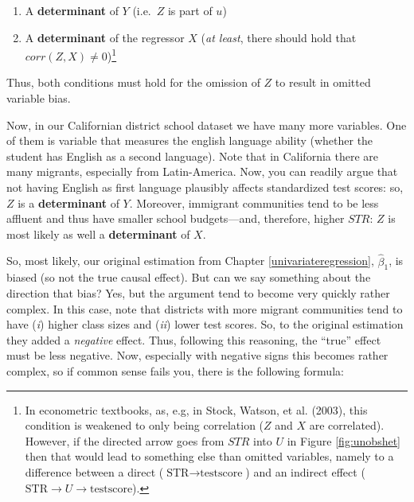 \documentclass[
]{book}
\providecommand{\tightlist}{%
  \setlength{\itemsep}{0pt}\setlength{\parskip}{0pt}}
\begin{document}
\begin{enumerate}
\def\labelenumi{\arabic{enumi}.}
\tightlist
\item
  A \textbf{determinant} of \(Y\) (i.e.~\(Z\) is part of \(u\))
\item
  A \textbf{determinant} of the regressor \(X\) (\emph{at least}, there should hold that \(corr(Z,X) \neq 0\))\footnote{In econometric textbooks, as, e.g, in Stock, Watson, et al. (2003), this condition is weakened to only being correlation (\(Z\) and \(X\) are correlated). However, if the directed arrow goes from \(STR\) into \(U\) in Figure \ref{fig:unobshet} then that would lead to something else than omitted variables, namely to a difference between a direct (\(\text{STR} \longrightarrow \text{testscore}\)) and an indirect effect (\(\text{STR} \longrightarrow U \longrightarrow \text{testscore}\)).}
\end{enumerate}

Thus, both conditions must hold for the omission of \(Z\) to result in omitted variable bias.

Now, in our Californian district school dataset we have many more variables. One of them is variable that measures the english language ability (whether the student has English as a second language). Note that in California there are many migrants, especially from Latin-America. Now, you can readily argue that not having English as first language plausibly affects standardized test scores: so, \(Z\) is a \textbf{determinant} of \(Y\). Moreover, immigrant communities tend to be less affluent and thus have smaller school budgets---and, therefore, higher \(STR\): \(Z\) is most likely as well a \textbf{determinant} of \(X\).

So, most likely, our original estimation from Chapter \ref{univariateregression}, \(\hat{\beta}_1\), is biased (so not the true causal effect). But can we say something about the direction that bias? Yes, but the argument tend to become very quickly rather complex. In this case, note that districts with more migrant communities tend to have (\emph{i}) higher class sizes and (\emph{ii}) lower test scores. So, to the original estimation they added a \emph{negative} effect. Thus, following this reasoning, the ``true'' effect must be less negative. Now, especially with negative signs this becomes rather complex, so if common sense fails you, there is the following formula:
\end{document}
